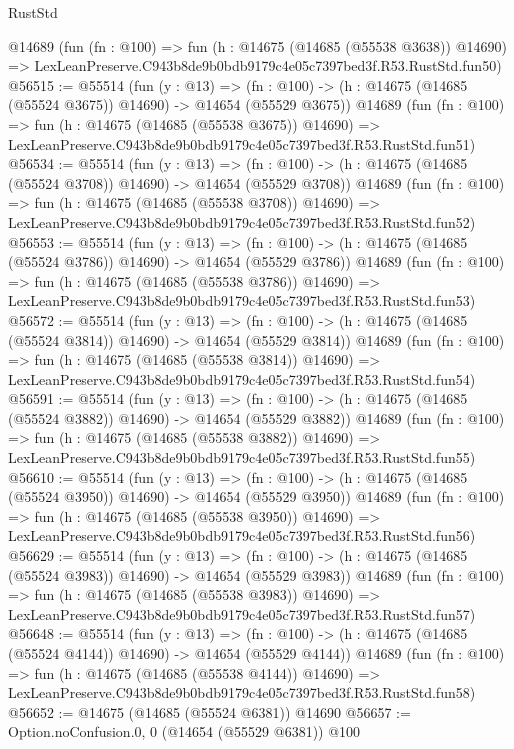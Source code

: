 \begin{lexlean}{RustStd}
\begin{coremodule}
    @14689
    (fun (fn : @100) =>
    fun (h : @14675 (@14685 (@55538 @3638)) @14690) =>
    LexLeanPreserve.C943b8de9b0bdb9179c4e05c7397bed3f.R53.RustStd.fun50)
@56515 := @55514
    (fun (y : @13) =>
    (fn : @100) -> (h : @14675 (@14685 (@55524 @3675)) @14690) -> @14654 (@55529 @3675))
    @14689
    (fun (fn : @100) =>
    fun (h : @14675 (@14685 (@55538 @3675)) @14690) =>
    LexLeanPreserve.C943b8de9b0bdb9179c4e05c7397bed3f.R53.RustStd.fun51)
@56534 := @55514
    (fun (y : @13) =>
    (fn : @100) -> (h : @14675 (@14685 (@55524 @3708)) @14690) -> @14654 (@55529 @3708))
    @14689
    (fun (fn : @100) =>
    fun (h : @14675 (@14685 (@55538 @3708)) @14690) =>
    LexLeanPreserve.C943b8de9b0bdb9179c4e05c7397bed3f.R53.RustStd.fun52)
@56553 := @55514
    (fun (y : @13) =>
    (fn : @100) -> (h : @14675 (@14685 (@55524 @3786)) @14690) -> @14654 (@55529 @3786))
    @14689
    (fun (fn : @100) =>
    fun (h : @14675 (@14685 (@55538 @3786)) @14690) =>
    LexLeanPreserve.C943b8de9b0bdb9179c4e05c7397bed3f.R53.RustStd.fun53)
@56572 := @55514
    (fun (y : @13) =>
    (fn : @100) -> (h : @14675 (@14685 (@55524 @3814)) @14690) -> @14654 (@55529 @3814))
    @14689
    (fun (fn : @100) =>
    fun (h : @14675 (@14685 (@55538 @3814)) @14690) =>
    LexLeanPreserve.C943b8de9b0bdb9179c4e05c7397bed3f.R53.RustStd.fun54)
@56591 := @55514
    (fun (y : @13) =>
    (fn : @100) -> (h : @14675 (@14685 (@55524 @3882)) @14690) -> @14654 (@55529 @3882))
    @14689
    (fun (fn : @100) =>
    fun (h : @14675 (@14685 (@55538 @3882)) @14690) =>
    LexLeanPreserve.C943b8de9b0bdb9179c4e05c7397bed3f.R53.RustStd.fun55)
@56610 := @55514
    (fun (y : @13) =>
    (fn : @100) -> (h : @14675 (@14685 (@55524 @3950)) @14690) -> @14654 (@55529 @3950))
    @14689
    (fun (fn : @100) =>
    fun (h : @14675 (@14685 (@55538 @3950)) @14690) =>
    LexLeanPreserve.C943b8de9b0bdb9179c4e05c7397bed3f.R53.RustStd.fun56)
@56629 := @55514
    (fun (y : @13) =>
    (fn : @100) -> (h : @14675 (@14685 (@55524 @3983)) @14690) -> @14654 (@55529 @3983))
    @14689
    (fun (fn : @100) =>
    fun (h : @14675 (@14685 (@55538 @3983)) @14690) =>
    LexLeanPreserve.C943b8de9b0bdb9179c4e05c7397bed3f.R53.RustStd.fun57)
@56648 := @55514
    (fun (y : @13) =>
    (fn : @100) -> (h : @14675 (@14685 (@55524 @4144)) @14690) -> @14654 (@55529 @4144))
    @14689
    (fun (fn : @100) =>
    fun (h : @14675 (@14685 (@55538 @4144)) @14690) =>
    LexLeanPreserve.C943b8de9b0bdb9179c4e05c7397bed3f.R53.RustStd.fun58)
@56652 := @14675 (@14685 (@55524 @6381)) @14690
@56657 := Option.noConfusion.{0, 0} (@14654 (@55529 @6381)) @100

\end{coremodule}
\end{lexlean}
